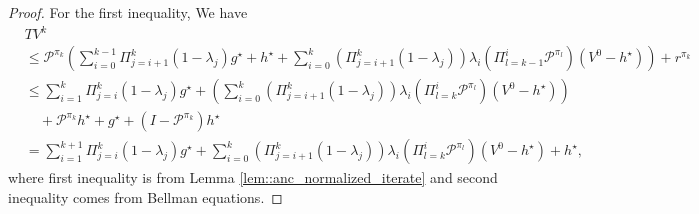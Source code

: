 \documentclass{article} %
\newcommand{\cP}{\mathcal{P}}
\newcommand*{\para}[1]{\left({#1}\right)}
\begin{document}
\begin{proof}
For the first inequality, We have
         \begin{align*}
           &TV^{k} 
           \\& \le \cP^{\pi_k}\para{\sum_{i=0}^{k-1} \Pi^k_{j=i+1} (1-\lambda_j)g^{\star}+h^{\star}+\sum_{i=0}^{k} (\Pi^k_{j=i+1} (1-\lambda_j)) \lambda_{i}\para{\Pi^{i}_{l=k-1}\cP^{\pi_l}}(V^0-h^{\star})} +r^{\pi_k}
           \\& \le \sum_{i=1}^{k} \Pi^k_{j=i} (1-\lambda_j)g^{\star}+\para{\sum_{i=0}^{k} (\Pi^k_{j=i+1} (1-\lambda_j)) \lambda_{i}\para{\Pi^{i}_{l=k}\cP^{\pi_l}}(V^0-h^{\star})} \\& \quad +\cP^{\pi_k}h^{\star}+g^{\star}+(I-\cP^{\pi_k})h^{\star}\\& =\sum_{i=1}^{k+1} \Pi^{k}_{j=i} (1-\lambda_j)g^{\star} +\sum_{i=0}^{k} (\Pi^k_{j=i+1} (1-\lambda_j)) \lambda_{i}\para{\Pi^{i}_{l=k}\cP^{\pi_l}}(V^0-h^{\star})+h^{\star},
       \end{align*}
       where first inequality is from Lemma \ref{lem::anc_normalized_iterate} and second inequality comes from Bellman equations. 


\end{proof}
\end{document}
